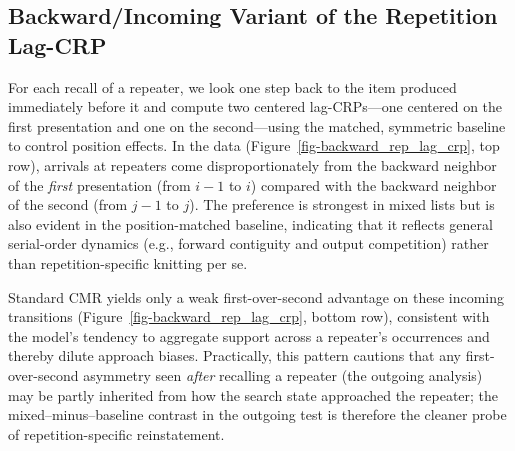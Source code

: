\documentclass[
  man,
  floatsintext,
  longtable,
  nolmodern,
  notxfonts,
  notimes,
  draftfirst,
  colorlinks=true,linkcolor=blue,citecolor=blue,urlcolor=blue]{apa7}
\begin{document}
\subsection{Backward/Incoming Variant of the Repetition
Lag-CRP}\label{backwardincoming-variant-of-the-repetition-lag-crp}

For each recall of a repeater, we look one step back to the item
produced immediately before it and compute two centered lag-CRPs---one
centered on the first presentation and one on the second---using the
matched, symmetric baseline to control position effects. In the data
(Figure~\ref{fig-backward_rep_lag_crp}, top row), arrivals at repeaters
come disproportionately from the backward neighbor of the \emph{first}
presentation (from \(i{-}1\) to \(i\)) compared with the backward
neighbor of the second (from \(j{-}1\) to \(j\)). The preference is
strongest in mixed lists but is also evident in the position-matched
baseline, indicating that it reflects general serial-order dynamics
(e.g., forward contiguity and output competition) rather than
repetition-specific knitting per se.

Standard CMR yields only a weak first-over-second advantage on these
incoming transitions (Figure~\ref{fig-backward_rep_lag_crp}, bottom
row), consistent with the model's tendency to aggregate support across a
repeater's occurrences and thereby dilute approach biases. Practically,
this pattern cautions that any first-over-second asymmetry seen
\emph{after} recalling a repeater (the outgoing analysis) may be partly
inherited from how the search state approached the repeater; the
mixed--minus--baseline contrast in the outgoing test is therefore the
cleaner probe of repetition-specific reinstatement.
\end{document}
